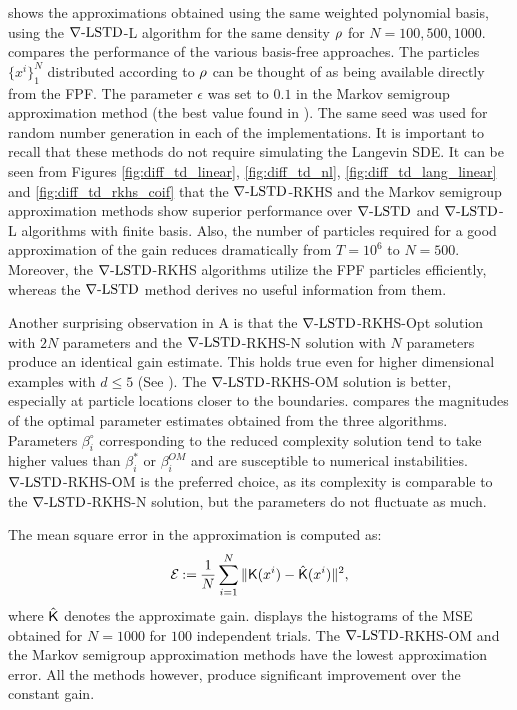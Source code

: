  shows the approximations obtained using the same weighted polynomial basis, using the $\nabla\text{-LSTD}$-L algorithm for the same density $\rho$ for $N = 100,500,1000$.
 compares the performance of the various basis-free approaches. The particles $\{x^i\}_1^N$ distributed according to $\rho$ can be thought of as being available directly from the FPF. The parameter $\epsilon$ was set to $0.1$ in the Markov semigroup approximation method (the best value found in \cite{tagmeh16a}). The same seed was used for random number generation in each of the implementations. It is important to recall that these methods do not require simulating the Langevin SDE. It can be seen from Figures \ref{fig:diff_td_linear}, \ref{fig:diff_td_nl}, \ref{fig:diff_td_lang_linear} and \ref{fig:diff_td_rkhs_coif} that the $\nabla\text{-LSTD}$-RKHS and the Markov semigroup approximation methods show superior performance over $\nabla\text{-LSTD}$ and $\nabla\text{-LSTD}$-L algorithms with finite basis. Also, the number of particles required for a good approximation of the gain reduces dramatically from $T=10^6$ to $N=500$. Moreover, the $\nabla\text{-LSTD}$-RKHS algorithms utilize the FPF particles efficiently, whereas the $\nabla\text{-LSTD}$ method derives no useful information from them.   

Another surprising observation in  A is that the $\nabla\text{-LSTD}$-RKHS-Opt solution with $2N$ parameters and the $\nabla\text{-LSTD}$-RKHS-N solution with $N$ parameters produce an identical gain estimate. This holds true even for higher dimensional examples with $d\leq 5$ (See ). The $\nabla\text{-LSTD}$-RKHS-OM solution is better, especially at particle locations closer to the boundaries.  compares the magnitudes of the optimal parameter estimates obtained from the three algorithms. Parameters $\beta_i^\circ$ corresponding to the reduced complexity solution tend to take higher values than $\beta_i^*$ or $\beta_i^{OM}$ and are susceptible to numerical instabilities. $\nabla\text{-LSTD}$-RKHS-OM is the preferred choice, as its complexity is comparable to the $\nabla\text{-LSTD}$-RKHS-N solution, but the parameters do not fluctuate as much. 

The mean square error in the approximation is computed as:
\begin{equation}
\mathcal{E} \eqdef \frac{1}{N} \sum_{i=1}^N \|\kFPF(x^i)  - \hat{\kFPF}(x^i) \|^2,
\label{e:gain_mse}
\end{equation}
where $\hat{\text{\sf K}}$ denotes the approximate gain.  displays the histograms of the MSE obtained for $N=1000$ for $100$ independent trials. The $\nabla\text{-LSTD}$-RKHS-OM and the Markov semigroup approximation methods have the lowest approximation error. All the methods however, produce significant improvement over the constant gain. 

